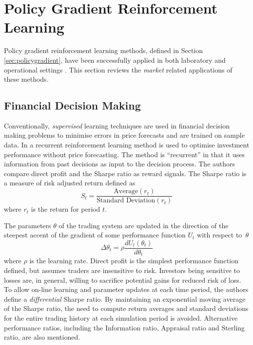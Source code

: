 \section{Policy Gradient Reinforcement Learning}
Policy gradient reinforcement learning methods, defined in Section
\ref{sec:policygradient}, have been successfully applied in both laboratory and
operational settings \cite{barto:policy,shaal:robots,peshkin:routing}.  This
section reviews the \textit{market} related applications of these methods.

\subsection{Financial Decision Making}
Conventionally, \textit{supervised} learning techniques are used in financial
decision making problems to minimise errors in price forecasts and are trained
on sample data.  In  a recurrent reinforcement learning
method is used to optimise investment performance without price forecasting.
The method is ``recurrent'' in that it uses information from past decisions as
input to the decision process.  The authors compare direct profit and the
Sharpe ratio \cite{sharpe:ratio66,sharpe:ratio94} as reward signals. The Sharpe ratio is a
measure of risk adjusted return defined as
\begin{equation}
S_t = \frac{\mbox{Average}(r_t)}{\mbox{Standard Deviation}(r_t)}
\end{equation}
where $r_t$ is the return for period $t$.

The parameters $\theta$ of the trading system are updated in the direction of
the steepest accent of the gradient of some performance function $U_t$ with
respect to~$\theta$
\begin{equation}
\Delta\theta_t = \rho \frac{dU_t(\theta_t)}{d\theta_t}
\end{equation}
where $\rho$ is the learning rate.  Direct profit is the simplest performance
function defined, but assumes traders are insensitive to risk.  Investors
being sensitive to losses are, in general, willing to sacrifice potential gains
for reduced risk of loss. To allow on-line learning and parameter updates at
each time period, the authors define a \textit{differential} Sharpe ratio.  By maintaining an
exponential moving average of the Sharpe ratio, the need to compute return
averages and standard deviations for the entire trading history at each
simulation period is avoided.  Alternative performance ratios, including the
Information ratio, Appraisal ratio and Sterling ratio, are also mentioned.

